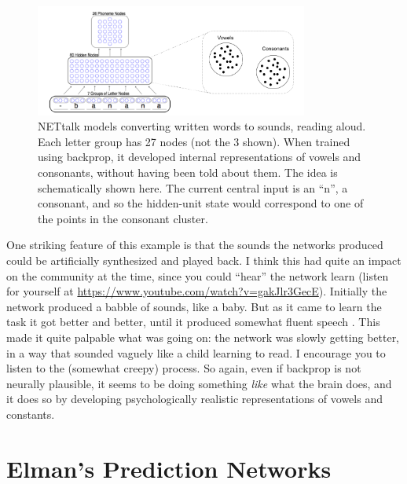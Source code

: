 \begin{figure}[h]
\centering
\includegraphics[width=0.8\textwidth]{images/netTalkCategories.png}
\caption[Pamela Payne and Jeff Yoshimi.]{NETtalk models converting written words to sounds, \ie reading aloud. Each letter group has 27 nodes (not the 3 shown). When trained using backprop, it developed internal representations of vowels and consonants, without having been told about them. The idea is schematically shown here. The current central input is an ``n'', a consonant, and so the hidden-unit state would correspond to one of the points in the consonant cluster.}
\label{net_talk}
\end{figure}

One striking feature of this example is that the sounds the networks produced could be artificially synthesized and played back.  I think this had quite an impact on the community at the time, since you could ``hear'' the network learn (listen for yourself at  \url{https://www.youtube.com/watch?v=gakJlr3GecE}). Initially the network produced a babble of sounds, like a baby. But as it came to learn the task it got better and better, until it produced somewhat fluent speech \cite{sejnowski1987parallel}. This made it quite palpable what was going on: the network was slowly getting better, in a way that sounded vaguely like a child learning to read. I encourage you to listen to the (somewhat creepy) process. So again, even if backprop is not neurally plausible, it seems to be doing something \emph{like} what the brain does, and it does so by developing psychologically realistic representations of vowels and constants.

\section{Elman's Prediction Networks}

